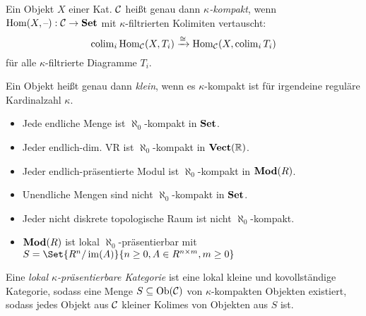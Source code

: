 \documentclass{cheat-sheet}
\begin{document}
\begin{defn}
  Ein Objekt $X$ einer Kat. $\mathcal{C}$ heißt genau dann \emph{$\kappa$-kompakt}, wenn $\operatorname{Hom}(X, \text{--}) : \mathcal{C} \to \mathbf{Set}$ mit $\kappa$-filtrierten Kolimiten vertauscht:
  \[
    \operatorname{colim}_i \operatorname{Hom}_{\mathcal{C}}(X, T_i) \xrightarrow{\cong} \operatorname{Hom}_{\mathcal{C}}(X, \operatorname{colim}_i T_i)
  \]
  für alle $\kappa$-filtrierte Diagramme $T_i$.
\end{defn}

\begin{defn}
  Ein Objekt heißt genau dann \emph{klein}, wenn es $\kappa$-kompakt ist für irgendeine reguläre Kardinalzahl $\kappa$.
\end{defn}

\iffalse
\begin{idee}
  Sei $X$ eine endliche Menge. Sei $X \subset \cup_{i \in \N} T_i$, $T_i \subseteq T_{i+1}$. Dann liegt $X$ schon vollständig in einem der $T_i$.
\end{idee}
\fi

\begin{bspe}
  \begin{itemize}
    \item Jede endliche Menge ist $\aleph_0$-kompakt in $\mathbf{Set}$.
    \item Jeder endlich-dim. VR ist $\aleph_0$-kompakt in $\mathbf{Vect}(\mathbb{R})$.
    \item Jeder endlich-präsentierte Modul ist $\aleph_0$-kompakt in $\mathbf{Mod}(R)$.
    \item Unendliche Mengen sind nicht $\aleph_0$-kompakt in $\mathbf{Set}$.
    \item Jeder nicht diskrete topologische Raum ist nicht $\aleph_0$-kompakt.
    \item $\mathbf{Mod}(R)$ ist lokal $\aleph_0$-präsentierbar mit $S = \Set{R^n/\im(A)}{n \geq 0, A \in R^{n \times m}, m \geq 0}$
  \end{itemize}
\end{bspe}

\begin{defn}
  Eine \emph{lokal $\kappa$-präsentierbare Kategorie} ist eine lokal kleine und kovollständige Kategorie, sodass eine Menge $S \subseteq \operatorname{Ob}(\mathcal{C})$ von $\kappa$-kompakten Objekten existiert, sodass jedes Objekt aus $\mathcal{C}$ kleiner Kolimes von Objekten aus $S$ ist.
\end{defn}

\end{document}
